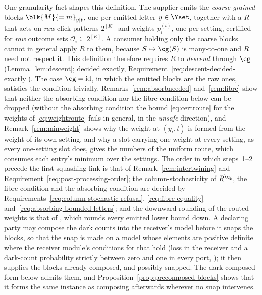One granularity fact shapes this definition. The supplier emits the
\emph{coarse-grained} blocks $\blk{M}{=m}_{y|t}$, one per emitted letter
$y\in\Yset$, together with a  $R$ that acts on
\emph{raw} click patterns $2^{[K]}$ and weights $p^{(t)}_i$, one per setting,
certified for \emph{raw} outcome sets $\mathcal{O}_i\subseteq2^{[K]}$. A
consumer holding only the coarse blocks cannot in general apply $R$ to them,
because $S\mapsto\cg(S)$ is many-to-one and $R$ need not respect it. This
definition therefore requires $R$ to \emph{descend} through $\cg$
(Lemma~\ref{lem:descent}; decided exactly,
Requirement~\ref{req:descent-decided-exactly}). The case $\cg=\mathrm{id}$, in
which the emitted blocks are the raw ones, satisfies the condition
trivially. Remarks~\ref{rem:absorbneeded} and~\ref{rem:fibre} show that
neither the absorbing condition nor the fibre condition below can be dropped
(without the absorbing condition the bound \eqref{eq:certroute} for the
weights of \eqref{eq:weightroute} fails in general, in the \emph{unsafe}
direction), and Remark~\ref{rem:minweight} shows why the weight at $(y_i,t)$
is formed from the weight of its own setting, and why a slot carrying one
weight at every setting, as every one-setting slot does, gives the numbers of
the uniform route, which consumes each entry's minimum over the settings.
The order in which steps~1--2 precede the first squashing link is that of
Remark~\ref{rem:intertwining} and Requirement~\ref{req:post-processing-order};
the column-stochasticity of $R^{\cg}$, the fibre condition and the absorbing
condition are decided by Requirements~\ref{req:column-stochastic-refusal},
\ref{req:fibre-equality} and~\ref{req:absorbing-bounded-letters}; and the
downward rounding of the routed weights is that of
, which rounds every emitted lower
bound down. A declaring party may compose the dark counts into the
receiver's model before it snaps the blocks, so that the snap is made on a
model whose elements are positive definite where the receiver module's
conditions for that hold (loss in the receiver and a dark-count probability
strictly between zero and one in every port,
); it then supplies
the blocks already composed, and possibly snapped. The dark-composed form
below admits them, and Proposition~\ref{prop:precomposed-blocks} shows that
it forms the same instance as composing afterwards wherever no snap
intervenes.

